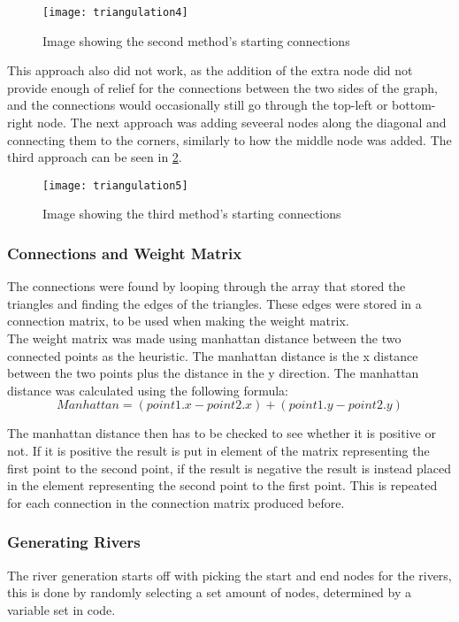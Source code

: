 \begin{figure}[H]
	\texttt{[image: triangulation4]}
	\centering
	\caption{Image showing the second method's starting connections}
	\label{fig:triangulation4}
\end{figure}
	
	This approach also did not work, as the addition of the extra node did not provide enough of relief for the connections between the two sides of the graph, and the connections would occasionally still go through the top-left or bottom-right node.
The next approach was adding seveeral nodes along the diagonal and connecting them to the corners, similarly to how the middle node was added. The third approach can be seen in \ref{fig:triangulation5}.

\begin{figure}[H]
	\texttt{[image: triangulation5]}
	\centering
	\caption{Image showing the third method's starting connections}
	\label{fig:triangulation5}
\end{figure}

\subsubsection{Connections and Weight Matrix}
	The connections were found by looping through the array that stored the triangles and finding the edges of the triangles. These edges were stored in a connection matrix, to be used when making the weight matrix.\\
	The weight matrix was made using manhattan distance between the two connected points as the heuristic. The manhattan distance is the x distance between the two points plus the distance in the y direction. The manhattan distance was calculated using the following formula:\\

$$Manhattan = (point1.x - point2.x) + (point1.y - point2.y)$$
	
	The manhattan distance then has to be checked to see whether it is positive or not. If it is positive the result is put in element of the matrix representing the first point to the second point, if the result is negative the result is instead placed in the element representing the second point to the first point. This is repeated for each connection in the connection matrix produced before.

\subsubsection{Generating Rivers}
	The river generation starts off with picking the start and end nodes for the rivers, this is done by randomly selecting a set amount of nodes, determined by a variable set in code. 

